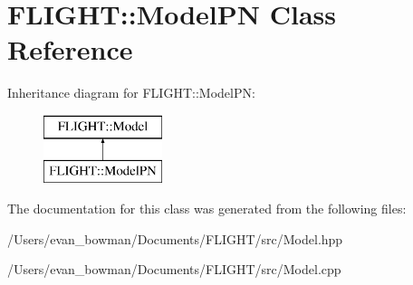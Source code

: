 \hypertarget{class_f_l_i_g_h_t_1_1_model_p_n}{}\section{F\+L\+I\+G\+HT\+:\+:Model\+PN Class Reference}
\label{class_f_l_i_g_h_t_1_1_model_p_n}
Inheritance diagram for F\+L\+I\+G\+HT\+:\+:Model\+PN\+:\begin{figure}[H]
\begin{center}
\leavevmode
\includegraphics[height=2.000000cm]{class_f_l_i_g_h_t_1_1_model_p_n}
\end{center}
\end{figure}


The documentation for this class was generated from the following files\+:\begin{DoxyCompactItemize}
\item 
/\+Users/evan\+\_\+bowman/\+Documents/\+F\+L\+I\+G\+H\+T/src/Model.\+hpp\item 
/\+Users/evan\+\_\+bowman/\+Documents/\+F\+L\+I\+G\+H\+T/src/Model.\+cpp\end{DoxyCompactItemize}
